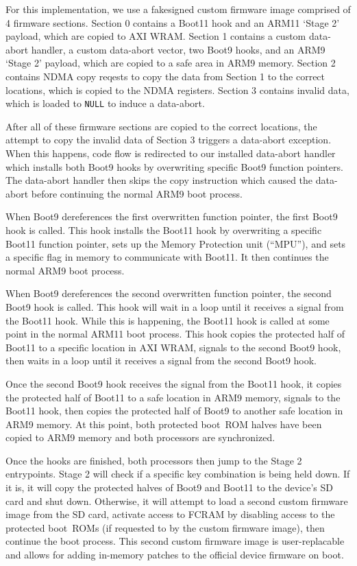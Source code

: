 \documentclass[journal]{IEEEtran}
\begin{document}
For this implementation, we use a fakesigned custom firmware image comprised of
4 firmware sections. Section 0 contains a Boot11 hook and an ARM11 `Stage 2'
payload, which are copied to AXI WRAM. Section 1 contains a custom data-abort
handler, a custom data-abort vector, two Boot9 hooks, and an ARM9 `Stage 2'
payload, which are copied to a safe area in ARM9 memory. Section 2 contains NDMA
copy reqests to copy the data from Section 1 to the correct locations, which is
copied to the NDMA registers. Section 3 contains invalid data, which is loaded
to \texttt{NULL} to induce a data-abort.

After all of these firmware sections are copied to the correct locations, the
attempt to copy the invalid data of Section 3 triggers a data-abort exception.
When this happens, code flow is redirected to our installed data-abort handler
which installs both Boot9 hooks by overwriting specific Boot9 function pointers.
The data-abort handler then skips the copy instruction which caused the
data-abort before continuing the normal ARM9 boot process. 

When Boot9 dereferences the first overwritten function pointer, the first Boot9
hook is called. This hook installs the Boot11 hook by overwriting a
specific Boot11 function pointer, sets up the Memory Protection unit (``MPU''),
and sets a specific flag in memory to communicate with Boot11. It then continues
the normal ARM9 boot process.

When Boot9 dereferences the second overwritten function pointer, the second
Boot9 hook is called. This hook will wait in a loop until it receives a signal
from the Boot11 hook. While this is happening, the Boot11 hook is called at some
point in the normal ARM11 boot process. This hook copies the protected half of
Boot11 to a specific location in AXI WRAM, signals to the second Boot9 hook,
then waits in a loop until it receives a signal from the second Boot9 hook.

Once the second Boot9 hook receives the signal from the Boot11 hook, it copies
the protected half of Boot11 to a safe location in ARM9 memory, signals to the
Boot11 hook, then copies the protected half of Boot9 to another safe location in
ARM9 memory. At this point, both protected boot~ROM halves have been copied to
ARM9 memory and both processors are synchronized.

Once the hooks are finished, both processors then jump to the Stage 2
entrypoints. Stage 2 will check if a specific key combination is being held
down. If it is, it will copy the protected halves of Boot9 and Boot11 to the
device's SD card and shut down. Otherwise, it will attempt to load a second
custom firmware image from the SD card, activate access to FCRAM by disabling
access to the protected boot~ROMs (if requested to by the custom firmware
image), then continue the boot process. This second custom firmware image is
user-replacable and allows for adding in-memory patches to the official device
firmware on boot.
\end{document}
